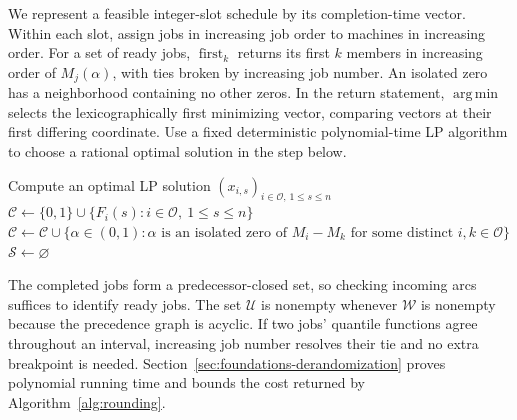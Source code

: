 We represent a feasible integer-slot schedule by its completion-time vector.
Within each slot, assign jobs in increasing job order to machines in increasing
order. For a set of ready jobs,
$\operatorname{first}_k$ returns its first $k$ members in increasing order
of $M_j(\alpha)$, with ties broken by increasing job number.
An isolated zero has a neighborhood containing no other zeros. In the
return statement, $\operatorname*{arg\,min}$ selects the lexicographically
first minimizing vector, comparing vectors at their first differing coordinate.
Use a fixed deterministic polynomial-time LP algorithm to choose a rational
optimal solution in the step below.

\begin{algorithm}[H]
\DontPrintSemicolon
\caption{Deterministic common-quantile scheduling}
\label{alg:rounding}
Compute an optimal LP solution $(x_{i,s})_{i\in\mathcal O,\,1\le s\le n}$\;
$\mathcal C\gets\{0,1\}\cup
  \bigl\{F_i(s):i\in\mathcal O,\ 1\le s\le n\bigr\}$\;
$\mathcal C\gets\mathcal C\cup
  \bigl\{\alpha\in(0,1):\text{$\alpha$ is an isolated zero of $M_i-M_k$ for
  some distinct $i,k\in\mathcal O$}\bigr\}$\;
$\mathcal S\gets\varnothing$\;
\;
\end{algorithm}

The completed jobs form a predecessor-closed set, so checking incoming arcs
suffices to identify ready jobs. The set $\mathcal U$ is nonempty whenever
$\mathcal W$ is nonempty because the precedence graph is acyclic.
If two jobs' quantile functions agree throughout an interval,
increasing job number resolves their tie and no extra breakpoint is
needed. Section~\ref{sec:foundations-derandomization} proves polynomial
running time and bounds the cost returned by Algorithm~\ref{alg:rounding}.

